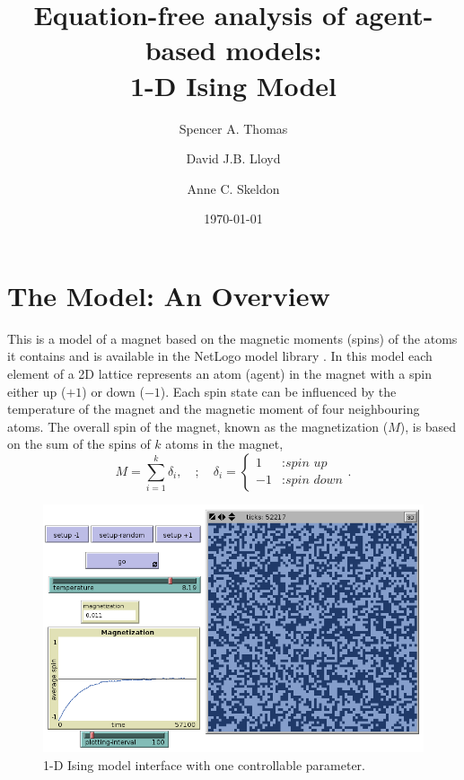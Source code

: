 \documentclass[11pt]{article}
\begin{document}
\title{Equation-free analysis of agent-based models:\\1-D Ising Model}

\author{Spencer A. Thomas}
\author{David J.B. Lloyd}
\author{Anne C. Skeldon}
\date{\today}
\maketitle



\section{The Model: An Overview}
This is a model of a magnet based on the magnetic moments (spins) of the atoms it contains \cite{Ising} and is available in the NetLogo model library \cite{Netlogo}. In this model each element of a 2D lattice represents an atom (agent) in the magnet with a spin either up ($+1$) or down ($-1$). Each spin state can be influenced by the temperature of the magnet and the magnetic moment of four neighbouring atoms. The overall spin of the magnet, known as the magnetization ($M$), is based on the sum of the spins of $k$ atoms in the magnet,
	\begin{equation}
	M = \sum_{i=1}^k \delta_i, \quad ; \quad
 	\delta_i = \left\{
  \begin{array}{cl}
     1 &: \textit{spin up}\\
    -1 &: \textit{spin down}
  \end{array}
	\right. 
	. 
	\end{equation}


\begin{figure}[h]
        \centering
        		\includegraphics[width=\textwidth]{IsingInterface.png}
        \caption{1-D Ising model interface with one controllable parameter.\label{ising}}
\end{figure}
\end{document}
